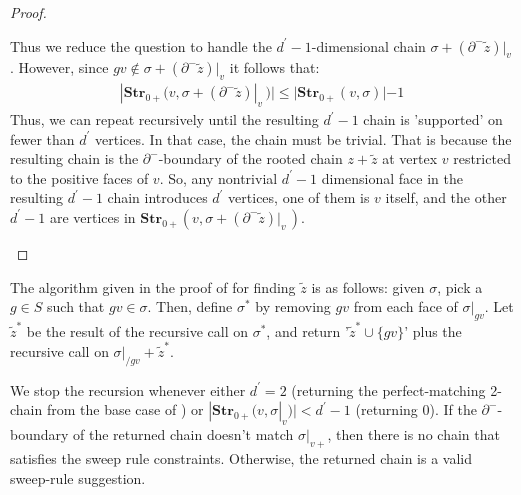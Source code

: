 \begin{proof}
\begin{enumerate}
Thus we reduce the question to handle the $d^{\prime}-1$-dimensional chain $\sigma + (\partial^{-} \tilde{z})|_{v}$. However, since $gv \notin  \sigma + (\partial^{-} \tilde{z})|_{v}$ it follows that: 
\begin{equation*}
  \begin{split}
    |\mathbf{Str}_{0+}(v, \sigma + (\partial^{-} \tilde{z})|_{v} \, )| \le  |\mathbf{Str}_{0+}(v, \sigma )| - 1
  \end{split}
\end{equation*}
Thus, we can repeat recursively until the resulting $d^{\prime}-1$ chain is 'supported' on fewer than $d^{\prime}$ vertices. In that case, the chain must be trivial. That is because the resulting chain is the $\partial^{-}$-boundary of the rooted chain $z + \tilde{z}$ at vertex $v$ restricted to the positive faces of $v$. So, any nontrivial $d^{\prime}-1$ dimensional face in the resulting $d^{\prime}-1$ chain introduces $d^{\prime}$ vertices, one of them is $v$ itself, and the other $d^{\prime}-1$ are vertices in $\mathbf{Str}_{0+}(v, \sigma + (\partial^{-} \tilde{z})|_{v} \, )$.
  \end{enumerate}
\end{proof}
The algorithm given in the proof of  for finding $\tilde{z}$ is as follows: given $\sigma$, pick a $g \in S$ such that $gv \in \sigma$. Then, define $\sigma^{*}$ by removing $gv$ from each face of $\sigma|_{gv}$. Let $\tilde{z}^{*}$ be the result of the recursive call on $\sigma^{*}$, and return '$\tilde{z}^{*} \cup \{gv\}$' plus the recursive call on $\sigma|_{/gv} + \tilde{z}^{*}$.

We stop the recursion whenever either $d^{\prime}=2$ (returning the perfect-matching 2-chain from the base case of  ) or $|\mathbf{Str}_{0+}(v, \sigma|_{v})| < d^{\prime}-1$ (returning $0$). If the $\partial^{-}$-boundary of the returned chain doesn't match $\sigma|_{v+}$, then there is no chain that satisfies the sweep rule constraints. Otherwise, the returned chain is a valid sweep-rule suggestion.

